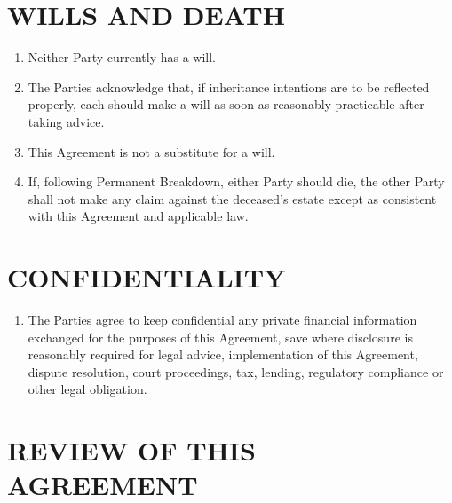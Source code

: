 \documentclass[10pt,a4paper]{article}
\begin{document}
\section*{WILLS AND DEATH}

\begin{enumerate}[label=\arabic*., start=57, leftmargin=1.8em]
    \item Neither Party currently has a will.
    \item The Parties acknowledge that, if inheritance intentions are to be reflected properly, each should make a will as soon as reasonably practicable after taking advice.
    \item This Agreement is not a substitute for a will.
    \item If, following Permanent Breakdown, either Party should die, the other Party shall not make any claim against the deceased's estate except as consistent with this Agreement and applicable law.
\end{enumerate}

\section*{CONFIDENTIALITY}

\begin{enumerate}[label=\arabic*., start=61, leftmargin=1.8em]
    \item The Parties agree to keep confidential any private financial information exchanged for the purposes of this Agreement, save where disclosure is reasonably required for legal advice, implementation of this Agreement, dispute resolution, court proceedings, tax, lending, regulatory compliance or other legal obligation.
\end{enumerate}

\section*{REVIEW OF THIS AGREEMENT}
\end{document}
